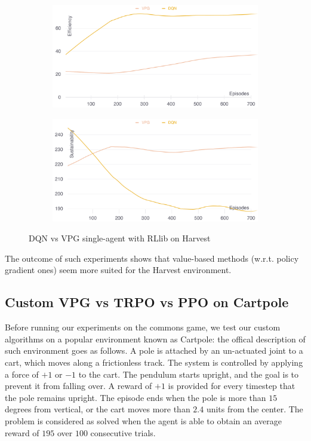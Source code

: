 \documentclass{article}
\begin{document}
\begin{figure}
  \centering
  \begin{subfigure}[b]{0.45\textwidth}
    \centering
    \includegraphics[width=\textwidth]{../assets/dqn-vpg-rllib-single-efficiency}
  \end{subfigure}
  \hfill
  \begin{subfigure}[b]{0.45\textwidth}
    \centering
    \includegraphics[width=\textwidth]{../assets/dqn-vpg-rllib-single-sustainability}
  \end{subfigure}
  \caption{DQN vs VPG single-agent with RLlib on Harvest}
  \label{fig:dqn-vs-vpg-rllib}
\end{figure}

The outcome of such experiments shows that value-based methods (w.r.t. policy gradient ones) seem more suited for the Harvest environment.

\subsection{Custom VPG vs TRPO vs PPO on Cartpole}
Before running our experiments on the commons game, we test our custom algorithms on a popular environment known as Cartpole: the offical description of such environment goes as follows. A pole is attached by an un-actuated joint to a cart, which moves along a frictionless track. The system is controlled by applying a force of $+1$ or $-1$ to the cart. The pendulum starts upright, and the goal is to prevent it from falling over. A reward of $+1$ is provided for every timestep that the pole remains upright. The episode ends when the pole is more than $15$ degrees from vertical, or the cart moves more than $2.4$ units from the center. The problem is considered as solved when the agent is able to obtain an average reward of $195$ over $100$ consecutive trials.
\end{document}
